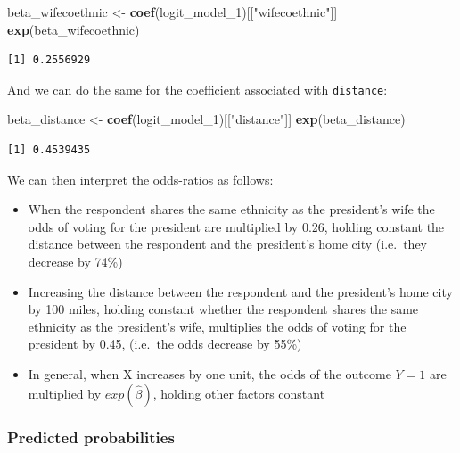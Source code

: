 \documentclass[]{article}
\newenvironment{Shaded}{\begin{snugshade}}{\end{snugshade}}
\newcommand{\KeywordTok}[1]{\textcolor[rgb]{0.13,0.29,0.53}{\textbf{#1}}}
\newcommand{\DecValTok}[1]{\textcolor[rgb]{0.00,0.00,0.81}{#1}}
\newcommand{\StringTok}[1]{\textcolor[rgb]{0.31,0.60,0.02}{#1}}
\newcommand{\NormalTok}[1]{#1}
\providecommand{\tightlist}{%
  \setlength{\itemsep}{0pt}\setlength{\parskip}{0pt}}
\theoremstyle{definition}
\theoremstyle{definition}
\theoremstyle{definition}
\theoremstyle{remark}
\begin{document}
\begin{Shaded}
\begin{Highlighting}[]
\NormalTok{beta_wifecoethnic <-}\StringTok{ }\KeywordTok{coef}\NormalTok{(logit_model_}\DecValTok{1}\NormalTok{)[[}\StringTok{"wifecoethnic"}\NormalTok{]]}
\KeywordTok{exp}\NormalTok{(beta_wifecoethnic)}
\end{Highlighting}
\end{Shaded}

\begin{verbatim}
[1] 0.2556929
\end{verbatim}

And we can do the same for the coefficient associated with
\texttt{distance}:

\begin{Shaded}
\begin{Highlighting}[]
\NormalTok{beta_distance <-}\StringTok{ }\KeywordTok{coef}\NormalTok{(logit_model_}\DecValTok{1}\NormalTok{)[[}\StringTok{"distance"}\NormalTok{]]}
\KeywordTok{exp}\NormalTok{(beta_distance)}
\end{Highlighting}
\end{Shaded}

\begin{verbatim}
[1] 0.4539435
\end{verbatim}

We can then interpret the odds-ratios as follows:

\begin{itemize}
\tightlist
\item
  When the respondent shares the same ethnicity as the president's wife
  the odds of voting for the president are multiplied by 0.26, holding
  constant the distance between the respondent and the president's home
  city (i.e.~they decrease by 74\%)
\item
  Increasing the distance between the respondent and the president's
  home city by 100 miles, holding constant whether the respondent shares
  the same ethnicity as the president's wife, multiplies the odds of
  voting for the president by 0.45, (i.e.~the odds decrease by 55\%)
\item
  In general, when X increases by one unit, the odds of the outcome
  \(Y = 1\) are multiplied by \(exp(\hat{\beta})\), holding other
  factors constant
\end{itemize}

\subsubsection{Predicted probabilities}\label{predicted-probabilities}
\end{document}
